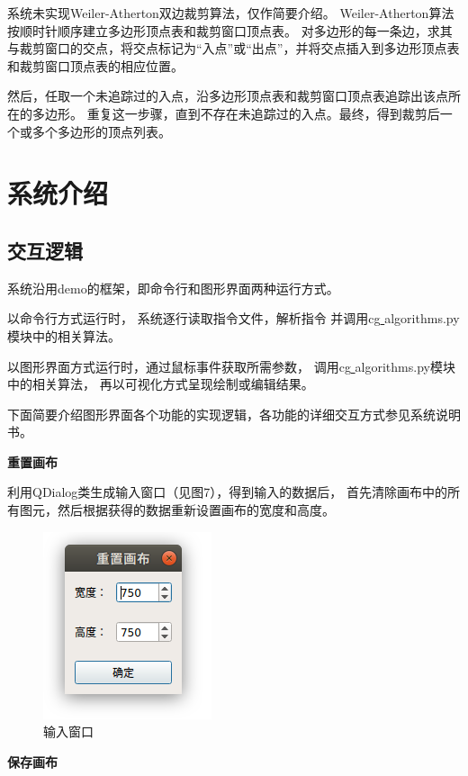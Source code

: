 \documentclass[a4paper,UTF8]{article}
\begin{document}
系统未实现Weiler-Atherton双边裁剪算法，仅作简要介绍。
Weiler-Atherton算法按顺时针顺序建立多边形顶点表和裁剪窗口顶点表。
对多边形的每一条边，求其与裁剪窗口的交点，将交点标记为“入点”或“出点”，并将交点插入到多边形顶点表和裁剪窗口顶点表的相应位置。

然后，任取一个未追踪过的入点，沿多边形顶点表和裁剪窗口顶点表追踪出该点所在的多边形。
重复这一步骤，直到不存在未追踪过的入点。最终，得到裁剪后一个或多个多边形的顶点列表。


\section{系统介绍}
\subsection{交互逻辑}
系统沿用demo的框架，即命令行和图形界面两种运行方式。

以命令行方式运行时，
系统逐行读取指令文件，解析指令
并调用cg\underline{ }algorithms.py模块中的相关算法。

以图形界面方式运行时，通过鼠标事件获取所需参数，
调用cg\underline{ }algorithms.py模块中的相关算法，
再以可视化方式呈现绘制或编辑结果。

下面简要介绍图形界面各个功能的实现逻辑，各功能的详细交互方式参见系统说明书。

\textbf{重置画布}

利用QDialog类生成输入窗口（见图7），得到输入的数据后，
首先清除画布中的所有图元，然后根据获得的数据重新设置画布的宽度和高度。
\begin{figure}[H]
    \centering
    \includegraphics[scale=0.8]{reset-canvas.PNG}
    \caption{输入窗口}
\end{figure}

\newpage
\textbf{保存画布}
\end{document}
